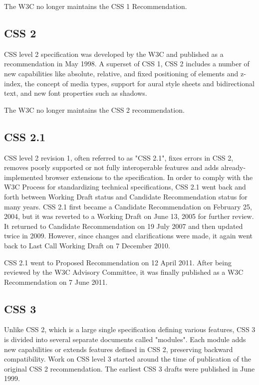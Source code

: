 The W3C no longer maintains the CSS 1 Recommendation.


\subsection{CSS 2}


CSS level 2 specification was developed by the W3C and published as a recommendation in May 1998. A superset of CSS 1, CSS 2 includes a number of new capabilities like absolute, relative, and fixed positioning of elements and z-index, the concept of media types, support for aural style sheets and bidirectional text, and new font properties such as shadows.

The W3C no longer maintains the CSS 2 recommendation.



\subsection{CSS 2.1}


CSS level 2 revision 1, often referred to as "CSS 2.1", fixes errors in CSS 2, removes poorly supported or not fully interoperable features and adds already-implemented browser extensions to the specification. In order to comply with the W3C Process for standardizing technical specifications, CSS 2.1 went back and forth between Working Draft status and Candidate Recommendation status for many years. CSS 2.1 first became a Candidate Recommendation on February 25, 2004, but it was reverted to a Working Draft on June 13, 2005 for further review. It returned to Candidate Recommendation on 19 July 2007 and then updated twice in 2009. However, since changes and clarifications were made, it again went back to Last Call Working Draft on 7 December 2010.

CSS 2.1 went to Proposed Recommendation on 12 April 2011. After being reviewed by the W3C Advisory Committee, it was finally published as a W3C Recommendation on 7 June 2011.





\subsection{CSS 3}

Unlike CSS 2, which is a large single specification defining various features, CSS 3 is divided into several separate documents called "modules". Each module adds new capabilities or extends features defined in CSS 2, preserving backward compatibility. Work on CSS level 3 started around the time of publication of the original CSS 2 recommendation. The earliest CSS 3 drafts were published in June 1999.


